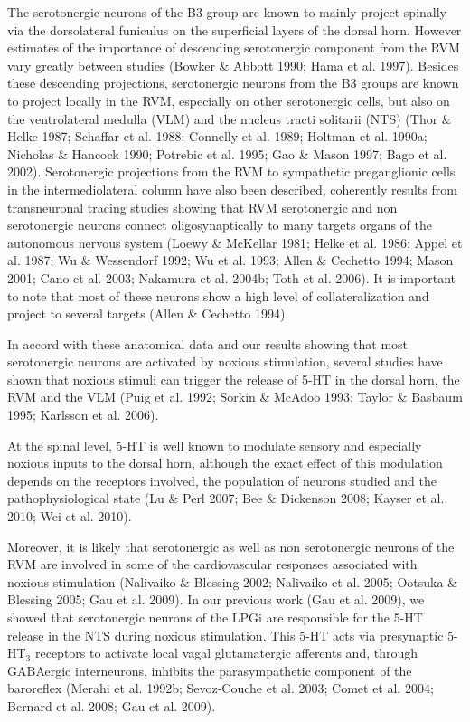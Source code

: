 \documentclass[a4paper,12pt,twoside]{report}
\begin{document}
The serotonergic neurons of the B3 group are known to mainly project spinally via the dorsolateral funiculus on the superficial layers of the dorsal horn. However estimates of the importance of descending serotonergic component from the RVM vary greatly between studies (Bowker \& Abbott 1990; Hama et al. 1997). Besides these descending projections, serotonergic neurons from the B3 groups are known to project locally in the RVM, especially on other serotonergic cells, but also on the ventrolateral medulla (VLM) and the nucleus tracti solitarii (NTS) (Thor \& Helke 1987; Schaffar et al. 1988; Connelly et al. 1989; Holtman et al. 1990a; Nicholas \& Hancock 1990; Potrebic et al. 1995; Gao \& Mason 1997; Bago et al. 2002). Serotonergic projections from the RVM to sympathetic preganglionic cells in the intermediolateral column have also been described, coherently results from transneuronal tracing studies showing that RVM serotonergic and non serotonergic neurons connect oligosynaptically to many targets organs of the autonomous nervous system (Loewy \& McKellar 1981; Helke et al. 1986; Appel et al. 1987; Wu \& Wessendorf 1992; Wu et al. 1993; Allen \& Cechetto 1994; Mason 2001; Cano et al. 2003; Nakamura et al. 2004b; Toth et al. 2006). It is important to note that most of these neurons show a high level of collateralization and project to several targets (Allen \& Cechetto 1994).

In accord with these anatomical data and our results showing that most serotonergic neurons are activated by noxious stimulation, several studies have shown that noxious stimuli can trigger the release of 5-HT in the dorsal horn, the RVM and the VLM (Puig et al. 1992; Sorkin \& McAdoo 1993; Taylor \& Basbaum 1995; Karlsson et al. 2006). 

At the spinal level, 5-HT is well known to modulate sensory and especially noxious inputs to the dorsal horn, although the exact effect of this modulation depends on the receptors involved, the population of neurons studied and the pathophysiological state (Lu \& Perl 2007; Bee \& Dickenson 2008; Kayser et al. 2010; Wei et al. 2010). 

Moreover, it is likely that serotonergic as well as non serotonergic neurons of the RVM are involved in some of the cardiovascular responses associated with noxious stimulation (Nalivaiko \& Blessing 2002; Nalivaiko et al. 2005; Ootsuka \& Blessing 2005; Gau et al. 2009). In our previous work (Gau et al. 2009), we showed that serotonergic neurons of the LPGi are responsible for the 5-HT release in the NTS during noxious stimulation. This 5-HT acts via presynaptic 5-HT$_{3}$ receptors to activate local vagal glutamatergic afferents and, through GABAergic interneurons, inhibits the parasympathetic component of the baroreflex (Merahi et al. 1992b; Sevoz-Couche et al. 2003; Comet et al. 2004; Bernard et al. 2008; Gau et al. 2009).
\end{document}
